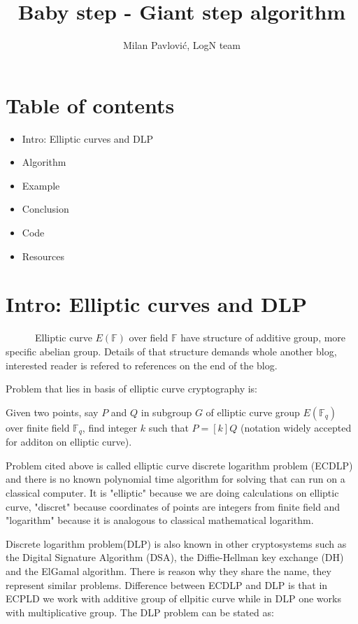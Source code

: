 \documentclass[fleqn,10pt]{olplainarticle}
\title{Baby step - Giant step algorithm}
\author[1]{Milan Pavlović, LogN team}
\begin{document}
\flushbottom
\maketitle
\thispagestyle{empty}

\section*{Table of contents}

\begin{itemize}[noitemsep] 
    \item Intro: Elliptic curves and DLP
    \item Algorithm
    \item Example
    \item Conclusion
    \item Code
    \item Resources
\end{itemize}


\section*{Intro: Elliptic curves and DLP}

\par \ \ \ \ \ \ Elliptic curve $E(\mathbb{F})$ over field $\mathbb{F}$ have structure
 of additive group, more specific abelian group. 
 Details of that structure demands whole another blog, 
 interested reader is refered to references on the end of the blog. 

Problem that lies in basis of elliptic curve cryptography is: 
\vspace{0.2cm}

Given two points, say $P$ and $Q$ in subgroup $G$ of elliptic 
curve group $E(\mathbb{F}_q)$ over finite field $\mathbb{F}_q$, 
find integer $k$ such that $P=[k]Q$ 
(notation widely accepted for additon on elliptic curve).
\vspace{0.2cm}

Problem cited above is called elliptic curve discrete logarithm 
problem (ECDLP) and there is no known polynomial time algorithm 
for solving that can run on a classical computer. 
It is "elliptic" because we are doing calculations on elliptic 
curve, "discret" because coordinates of points are integers 
from finite field and "logarithm" because it is analogous to classical 
mathematical logarithm.

Discrete logarithm problem(DLP) is also known in other 
cryptosystems such as the Digital Signature Algorithm (DSA), 
the Diffie-Hellman key exchange (DH) and the ElGamal algorithm. 
There is reason why they share the name, they represent similar 
problems. Difference between ECDLP and DLP is that in ECPLD we 
work with additive group of ellpitic curve while in DLP one 
works with multiplicative group. The DLP problem can be stated 
as:
\vspace{0.2cm}
\end{document}
